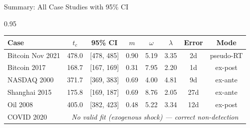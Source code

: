 \documentclass[9pt, aspectratio=169, t]{beamer}
\begin{document}
\begin{frame}{Summary: All Case Studies with 95\% CI}
    \begin{cminipage}{0.95\textwidth}
    {\scriptsize
    \begin{center}
        \begin{tabular}{lccccccc}
            \toprule
            \textbf{Case} & \textbf{$t_c$} & \textbf{95\% CI} & \textbf{$m$} & \textbf{$\omega$} & \textbf{$\lambda$} & \textbf{Error} & \textbf{Mode} \\
            \midrule
            Bitcoin Nov 2021 & 478.0 & [478, 485] & 0.90 & 5.19 & 3.35 & 2d & pseudo-RT \\
            Bitcoin 2017 & 168.7 & [167, 169] & 0.31 & 7.95 & 2.20 & 1d & ex-post \\
            NASDAQ 2000 & 371.7 & [369, 383] & 0.69 & 4.00 & 4.81 & 9d & ex-ante \\
            Shanghai 2015 & 175.8 & [169, 187] & 0.69 & 8.76 & 2.05 & 27d & ex-ante \\
            Oil 2008 & 405.0 & [382, 423] & 0.48 & 5.22 & 3.34 & 12d & ex-post \\
            \midrule
            COVID 2020 & \multicolumn{7}{c}{\textit{No valid fit (exogenous shock) --- correct non-detection}} \\
            \bottomrule
        \end{tabular}
    \end{center}

}
\end{cminipage}
\end{frame}
\end{document}
